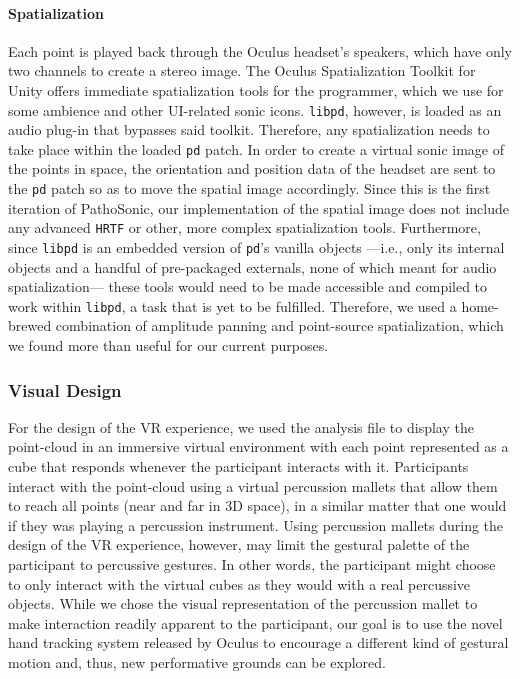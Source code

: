 \documentclass{nime-alternate}
\begin{document}
\paragraph{Spatialization}
Each point is played back through the Oculus headset's speakers, which have only two channels to create a stereo image. The Oculus Spatialization Toolkit for Unity offers immediate spatialization tools for the programmer, which we use for some ambience and other UI-related sonic icons. \texttt{libpd}, however, is loaded as an audio plug-in that bypasses said toolkit. Therefore, any spatialization needs to take place within the loaded \texttt{pd} patch. In order to create a virtual sonic image of the points in space, the orientation and position data of the headset are sent to the \texttt{pd} patch so as to move the spatial image accordingly. Since this is the first iteration of PathoSonic, our implementation of the spatial image does not include any advanced \texttt{HRTF} or other, more complex spatialization tools. Furthermore, since \texttt{libpd} is an embedded version of \texttt{pd}'s vanilla objects ---i.e., only its internal objects and a handful of pre-packaged externals, none of which meant for audio spatialization--- these tools would need to be made accessible and compiled to work within \texttt{libpd}, a task that is yet to be fulfilled. Therefore, we used a home-brewed combination of amplitude panning and point-source spatialization, which we found more than useful for our current purposes.


\subsubsection{Visual Design}

For the design of the VR experience, we used the analysis file to display the point-cloud in an immersive virtual environment with each point represented as a cube that responds whenever the participant interacts with it. Participants interact with the point-cloud using a virtual percussion mallets that allow them to reach all points (near and far in 3D space), in a similar matter that one would if they was playing a percussion instrument. Using percussion mallets during the design of the VR experience, however, may limit the gestural palette of the participant to percussive gestures. In other words, the participant might choose to only interact with the virtual cubes as they would with a real percussive objects. While we chose the visual representation of the percussion mallet to make interaction readily apparent to the participant, our goal is to use the novel hand tracking system released by Oculus to encourage a different kind of gestural motion and, thus, new performative grounds can be explored. 
\end{document}
